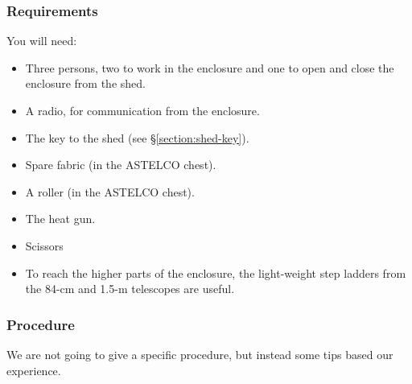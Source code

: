 \subsubsection{Requirements}

You will need:

\begin{itemize}
\item Three persons, two to work in the enclosure and one to open and close the enclosure from the shed.
\item A radio, for communication from the enclosure.
\item The key to the shed (see \S\ref{section:shed-key}).
\item Spare fabric (in the ASTELCO chest).
\item A roller (in the ASTELCO chest).
\item The heat gun.
\item Scissors
\item To reach the higher parts of the enclosure, the light-weight step ladders from the 84-cm and 1.5-m telescopes are useful.
\end{itemize}

\subsubsection{Procedure}

We are not going to give a specific procedure, but instead some tips based our experience.

